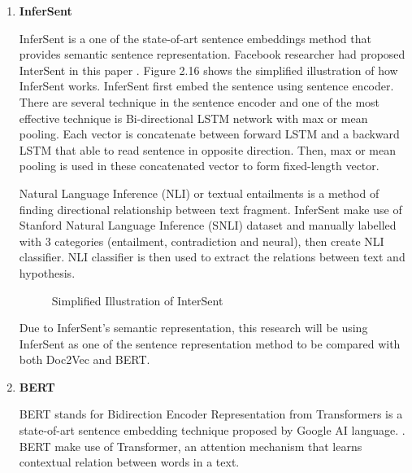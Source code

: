 \documentclass[twoside]{utmthesis}
\begin{document}
\begin{enumerate}
		
	\item \textbf{InferSent}
	
	InferSent is a one of the state-of-art sentence embeddings method that provides semantic sentence representation. Facebook researcher had proposed InterSent in this paper \cite{conneau2017supervised}. Figure 2.16 shows the simplified illustration of how InferSent works. InferSent first embed the sentence using sentence encoder. There are several technique in the sentence encoder and one of the most effective technique is Bi-directional LSTM network with max or mean pooling. Each vector is concatenate between forward LSTM and a backward LSTM that able to read sentence in opposite direction. Then, max or mean pooling is used in these concatenated vector to form fixed-length vector.  
	
	
	Natural Language Inference (NLI) or textual entailments is a method of finding directional relationship between text fragment. InferSent make use of Stanford Natural Language Inference (SNLI) dataset and manually labelled with 3 categories (entailment, contradiction and neural), then create NLI classifier. NLI classifier is then used to extract the relations between text and hypothesis. 
	
	\begin{figure}[H]
		\centering
		\caption{Simplified Illustration of InterSent}
		\label{fig:infersent}
	\end{figure}

	Due to InferSent's semantic representation, this research will be using InferSent as one of the sentence representation method to be compared with both Doc2Vec and BERT. 
	 
	
	\item \textbf{BERT} 
	
	BERT stands for Bidirection Encoder Representation from Transformers is a state-of-art sentence embedding technique proposed by Google AI language. \citep{devlin2018bert}. BERT make use of Transformer, an attention mechanism that learns contextual relation between words in a text. 
	

\end{enumerate}
\end{document}
